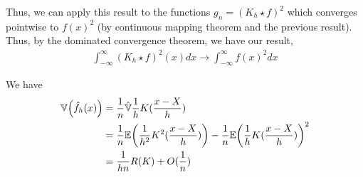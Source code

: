 \begin{exercises}
  Thus, we  can apply this result to the functions $g_{n} = (K_{h}
  \star f)^{2}$ which converges pointwise to $f(x)^{2}$ (by continuous
  mapping theorem and the previous result).  Thus, by the dominated
  convergence theorem, we have our result,
  \begin{align}
    \label{eq:24}
    \int_{-\infty}^{\infty} (K_{h} \star f)^{2}(x) dx \rightarrow
    \int_{-\infty}^{\infty} f(x)^{2} dx
  \end{align}

  We have
  \begin{align}
    \label{eq:25}
    \Var{\hat f_{h}(x)} &= \frac{1}{n} \hat \Var{\frac{1}{h}K(\frac{x
        - X}{h})} \\
    &= \frac{1}{n} \E{\frac{1}{h^{2}} K^{2}(\frac{x-X}{h})} -
    \frac{1}{n} \E{\frac{1}{h} K(\frac{x - X}{h})}^{2} \\
    &= \frac{1}{hn}R(K) + O(\frac{1}{n})
  \end{align}
\item
\end{exercises}


